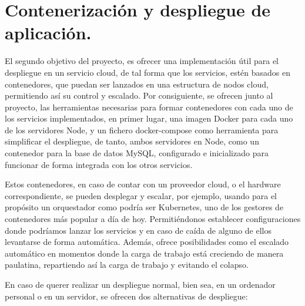 \section{Contenerización y despliegue de aplicación.}

El segundo objetivo del proyecto, es ofrecer una implementación útil para el despliegue en un servicio cloud, de tal forma que los servicios, estén basados en contenedores, que puedan ser lanzados en una estructura de nodos cloud, permitiendo así su control y escalado. Por consiguiente, se ofrecen junto al proyecto, las herramientas necesarias para formar contenedores con cada uno de los servicios implementados, en primer lugar, una imagen Docker para cada uno de los servidores Node, y un fichero docker-compose como herramienta para simplificar el despliegue, de tanto, ambos servidores en Node, como un contenedor para la base de datos MySQL, configurado e inicializado para funcionar de forma integrada con los otros servicios.

Estos contenedores, en caso de contar con un proveedor cloud, o el hardware correspondiente, se pueden desplegar y escalar, por ejemplo, usando para el propósito un orquestador como podría ser Kubernetes, uno de los gestores de contenedores más popular a día de hoy. Permitiéndonos establecer configuraciones donde podríamos lanzar los servicios y en caso de caída de alguno de ellos levantarse de forma automática. Además, ofrece posibilidades como el escalado automático en momentos donde la carga de trabajo está creciendo de manera paulatina, repartiendo así la carga de trabajo y evitando el colapso.

En caso de querer realizar un despliegue normal, bien sea, en un ordenador personal o en un servidor, se ofrecen dos alternativas de despliegue:


